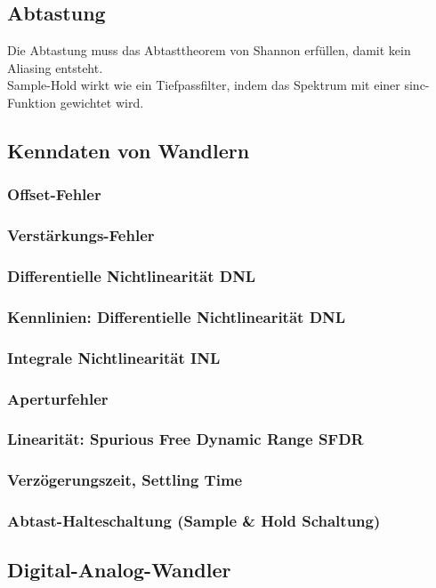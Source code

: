 \subsection{Abtastung}
Die Abtastung muss das Abtasttheorem von Shannon erfüllen, damit kein Aliasing entsteht.\\
Sample-Hold wirkt wie ein Tiefpassfilter, indem das Spektrum mit einer sinc-Funktion gewichtet wird.
\subsection{Kenndaten von Wandlern}
\subsubsection{Offset-Fehler}
\subsubsection{Verstärkungs-Fehler}
\subsubsection{Differentielle Nichtlinearität DNL}
\subsubsection{Kennlinien: Differentielle Nichtlinearität DNL}
\subsubsection{Integrale Nichtlinearität INL}
\subsubsection{Aperturfehler}
\subsubsection{Linearität: Spurious Free Dynamic Range SFDR}
\subsubsection{Verzögerungszeit, Settling Time}
\subsubsection{Abtast-Halteschaltung (Sample \& Hold Schaltung)}

\subsection{Digital-Analog-Wandler}
